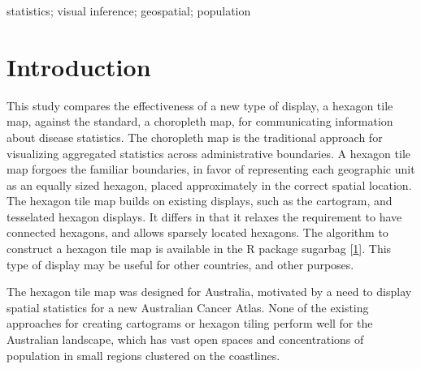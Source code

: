 \documentclass[conference,final,]{IEEEtran}
\begin{document}
\begin{IEEEkeywords}
statistics; visual inference; geospatial; population
\end{IEEEkeywords}




\maketitle


%
\IEEEpeerreviewmaketitle


\hypertarget{introduction}{%
\section{Introduction}\label{introduction}}

This study compares the effectiveness of a new type of display, a hexagon tile map, against the standard, a choropleth map, for communicating information about disease statistics. The choropleth map is the traditional approach for visualizing aggregated statistics across administrative boundaries. A hexagon tile map forgoes the familiar boundaries, in favor of representing each geographic unit as an equally sized hexagon, placed approximately in the correct spatial location. The hexagon tile map builds on existing displays, such as the cartogram, and tesselated hexagon displays. It differs in that it relaxes the requirement to have connected hexagons, and allows sparsely located hexagons. The algorithm to construct a hexagon tile map is available in the R package sugarbag {[}\protect\hyperlink{ref-sugarbag}{1}{]}. This type of display may be useful for other countries, and other purposes.

The hexagon tile map was designed for Australia, motivated by a need to display spatial statistics for a new Australian Cancer Atlas. None of the existing approaches for creating cartograms or hexagon tiling perform well for the Australian landscape, which has vast open spaces and concentrations of population in small regions clustered on the coastlines.
\end{document}
